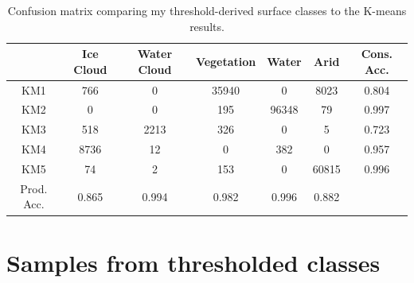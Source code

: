 \documentclass[12pt]{article}
\begin{document}
\begin{table}[h!]
\centering
\begin{tabular}{C|CCCCC|C}
& \textnormal{Ice Cloud} & \textnormal{Water Cloud} & \textnormal{Vegetation} & \textnormal{Water} & \textnormal{Arid} & \textnormal{Cons. Acc.} \\
\hline
\textnormal{KM1} & 766 & 0 & 35940 & 0 & 8023 & 0.804 \\
\textnormal{KM2} & 0 & 0 & 195 & 96348 & 79 & 0.997 \\
\textnormal{KM3} & 518 & 2213 & 326 & 0 & 5 & 0.723 \\
\textnormal{KM4} & 8736 & 12 & 0 & 382 & 0 & 0.957 \\
\textnormal{KM5} & 74 & 2 & 153 & 0 & 60815 & 0.996 \\

\hline
\textnormal{Prod. Acc.} & 0.865 & 0.994 & 0.982 & 0.996 & 0.882\\
\end{tabular}
\caption{Confusion matrix comparing my threshold-derived surface classes to the K-means results.}
\label{confusion_km-thresh}
\end{table}

\clearpage

\section{Samples from thresholded classes}
\end{document}
